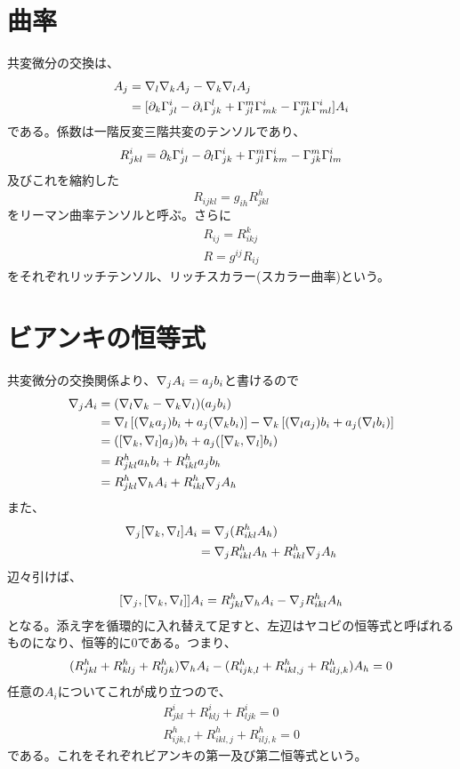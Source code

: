 \section{曲率}
    共変微分の交換は、
    \begin{align*}
        [\na_l,\na_k]A_j &= \na_l\na_kA_j-\na_k\na_lA_j\\
        &= [\pa_k\Ga^i_{jl}-\pa_i\Ga^l_{jk}
        +\Ga^m_{jl}\Ga^i_{mk}-\Ga^m_{jk}\Ga^i_{ml}]A_i
    \end{align*}
    である。係数は一階反変三階共変のテンソルであり、
        \[R^i_{jkl}
        =\partial_k\Gamma^i_{jl}-\partial_l\Gamma^i_{jk}
        +\Gamma^m_{jl}\Gamma^i_{km}-\Gamma^m_{jk}\Gamma^i_{lm}\]
    及びこれを縮約した
        \[R_{ijkl} = g_{ih}R^h_{jkl}\]
    をリーマン曲率テンソルと呼ぶ。さらに
    \begin{gather*}
        R_{ij} = R^k_{ikj}\\
        R = g^{ij}R_{ij}
    \end{gather*}
    をそれぞれリッチテンソル、リッチスカラー(スカラー曲率)という。


\section{ビアンキの恒等式}
    共変微分の交換関係より、$\nabla_jA_i = a_jb_i$と書けるので
    \begin{align*}
        [\na_k,\na_l]\na_jA_i &= (\na_l\na_k-\na_k\na_l)(a_jb_i)\\
        &= \na_l\llr{(\na_ka_j)b_i+a_j(\na_kb_i)}-\na_k\llr{(\na_la_j)b_i+a_j(\na_lb_i)}\\
        &= ([\na_k,\na_l]a_j)b_i+a_j([\na_k,\na_l]b_i)\\
        &= R^h_{jkl}a_hb_i+R^h_{ikl}a_jb_h\\
        &= R^h_{jkl}\na_hA_i+R^h_{ikl}\na_jA_h
    \end{align*}
    また、
    \begin{align*}
        \nabla_j[\nabla_k,\nabla_l]A_i &= \nabla_j(R^h_{ikl}A_h)\\
        &= \nabla_jR^h_{ikl}A_h+R^h_{ikl}\nabla_jA_h
    \end{align*}
    辺々引けば、
        \[[\nabla_j,[\nabla_k,\nabla_l]]A_i = R^h_{jkl}\nabla_hA_i-\nabla_jR^h_{ikl}A_h\]
    となる。添え字を循環的に入れ替えて足すと、左辺はヤコビの恒等式と呼ばれるものになり、恒等的に0である。つまり、
        \[(R^h_{jkl}+R^h_{klj}+R^h_{ljk})\nabla_hA_i
        -(R^h_{ijk,l}+R^h_{ikl,j}+R^h_{ilj,k})A_h = 0\]
    任意の$A_i$についてこれが成り立つので、
    \begin{gather*}
        R^i_{jkl}+R^i_{klj}+R^i_{ljk} = 0\\
        R^h_{ijk,l}+R^h_{ikl,j}+R^h_{ilj,k} = 0
    \end{gather*}
    である。これをそれぞれビアンキの第一及び第二恒等式という。

